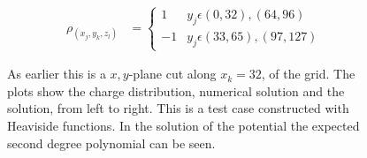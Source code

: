 		\begin{align}
			\rho_(x_j,y_k,z_l) &= \begin{cases} 1  & y_j \epsilon (0, 32), (64,96)\\ -1  & y_j \epsilon (33, 65), (97,127) \end{cases}
		\end{align}

		\begin{figure}
			\centering
			\caption{As earlier this is a \(x,y\)-plane cut along \(x_k=32\), of the grid. The plots show the charge distribution,
			numerical solution and the solution, from left to right. This is a test case constructed
			with Heaviside functions. In the solution of the potential the expected second degree polynomial can be seen.
			}
			\label{fig:heaviside}
		\end{figure}

